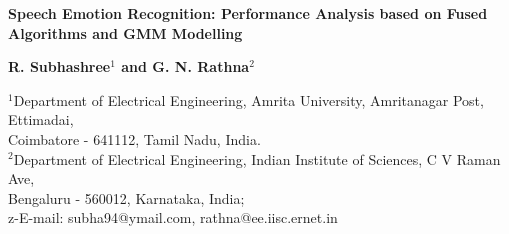 \documentclass[10pt,a4paper]{article}
\begin{document}
{\huge \fontsize{20,74pt}{10pt}\selectfont \color{tieude}\begin{flushright}
\fontsize{17,28pt}{23pt}\selectfont \textbf{Speech Emotion Recognition: Performance Analysis based on Fused Algorithms and GMM Modelling}
\end{flushright}}
\begin{flushright}
\textbf{{R. Subhashree}$^1$ and {G. N. Rathna}$^2$}
\end{flushright}
\begin{flushright}
{{$^1${Department of Electrical Engineering, Amrita University, Amritanagar Post, Ettimadai,}\\
Coimbatore - 641112, Tamil Nadu, India.\\
$^2$Department of Electrical Engineering, Indian Institute of Sciences, C V Raman Ave,\\
Bengaluru - 560012, Karnataka, India;\\
z-E-mail: subha94@ymail.com, rathna@ee.iisc.ernet.in}}
\end{flushright}
\vspace{-0,4cm}
\setlength{\FrameRule}{2pt}
\setlength{\FrameSep}{5pt}
\end{document}
